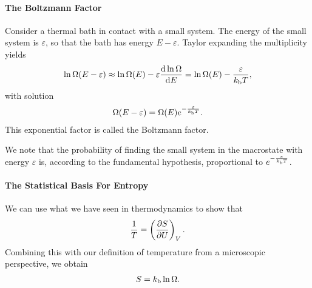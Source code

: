 \paragraph{The Boltzmann Factor}
Consider a thermal bath in contact with a small system. The energy of the small system is $\varepsilon$, so that the bath has energy $E - \varepsilon$. Taylor expanding the multiplicity yields
\begin{align*}
	\ln{\Omega(E - \varepsilon)} \approx \ln{\Omega(E)} - \varepsilon\dv{\ln{\Omega}}{E} = \ln{\Omega(E)} - \frac{\varepsilon}{k_{\text{b}} T},
\end{align*}
with solution
\begin{align*}
	\Omega(E - \varepsilon) = \Omega(E)e^{-\frac{\varepsilon}{k_{\text{b}} T}}.
\end{align*}
This exponential factor is called the Boltzmann factor.

We note that the probability of finding the small system in the macrostate with energy $\varepsilon$ is, according to the fundamental hypothesis, proportional to $e^{-\frac{\varepsilon}{k_{\text{b}} T}}$.

\paragraph{The Statistical Basis For Entropy}
We can use what we have seen in thermodynamics to show that
\begin{align*}
	\frac{1}{T} = \left(\pdv{S}{U}\right)_{V}.
\end{align*}
Combining this with our definition of temperature from a microscopic perspective, we obtain
\begin{align*}
	S = k_{\text{b}}\ln{\Omega}.
\end{align*}

